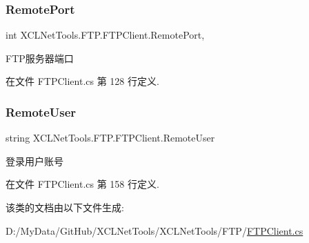 \subsubsection{\texorpdfstring{Remote\+Port}{RemotePort}}
{\footnotesize\ttfamily int X\+C\+L\+Net\+Tools.\+F\+T\+P.\+F\+T\+P\+Client.\+Remote\+Port\hspace{0.3cm}{\ttfamily [get]}, {\ttfamily [set]}}



F\+T\+P服务器端口 



在文件 F\+T\+P\+Client.\+cs 第 128 行定义.

\mbox{\label{class_x_c_l_net_tools_1_1_f_t_p_1_1_f_t_p_client_ab97c698dca9a54f44b1e69cb15c1126d}} 
\subsubsection{\texorpdfstring{Remote\+User}{RemoteUser}}
{\footnotesize\ttfamily string X\+C\+L\+Net\+Tools.\+F\+T\+P.\+F\+T\+P\+Client.\+Remote\+User\hspace{0.3cm}{\ttfamily [set]}}



登录用户账号 



在文件 F\+T\+P\+Client.\+cs 第 158 行定义.



该类的文档由以下文件生成\+:\begin{DoxyCompactItemize}
\item 
D\+:/\+My\+Data/\+Git\+Hub/\+X\+C\+L\+Net\+Tools/\+X\+C\+L\+Net\+Tools/\+F\+T\+P/\hyperlink{_f_t_p_client_8cs}{F\+T\+P\+Client.\+cs}\end{DoxyCompactItemize}
